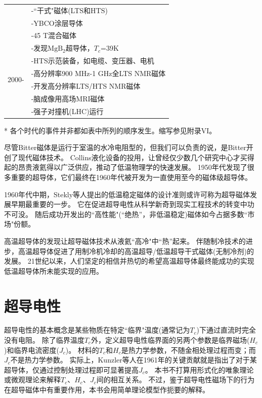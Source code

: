 \begin{table}[htbp]
\begin{threeparttable}
\begin{tabular}{ |c||l|}
 & -``干式"磁体(LTS和HTS)\\
 & -YBCO涂层导体\\
 & -45 T混合磁体\\
 \hline
  \multirow{6}{*}{2000-} & -发现$\mathrm{MgB_2}$超导体，$T_c$=39K \\
 & -HTS示范装备，如电缆、变压器、电机\\
 & -高分辨率900 MHz-1 GHz全LTS NMR磁体 \\
 & -开发高分辨率LTS/HTS NMR磁体\\
 & -脑成像用高场MRI磁体\\
 & -强子对撞机(LHC)运行\\
 \hline
\end{tabular}
 \begin{tablenotes}
        \footnotesize
        \item[*] 各个时代的事件并非都如表中所列的顺序发生。缩写参见附录VI。%
      \end{tablenotes}
    \end{threeparttable}
\end{table}

尽管Bitter磁体是运行于室温的水冷电阻型的，但我们可以负责的说，是Bitter开创了现代磁体技术。
Collins液化设备的投用，让曾经仅少数几个研究中心才买得起的昂贵液氦得以广泛供应，推动了低温物理学的快速发展。
1950年代发现了很多重要的超导体，它们最终在1960年代被开发为一直使用至今的磁体级超导体。

1960年代中期，Stekly等人提出的低温稳定磁体的设计准则或许可称为超导磁体发展早期最重要的一步。
它在促进超导电性从科学新奇到现实工程技术的转变中功不可没。
随后成功开发出的``高性能"(``绝热''，非低温稳定)磁体如今占据多数``市场"份额。

高温超导体的发现让超导磁体技术从液氦``高冷"中``热''起来。
伴随制冷技术的进步，高温超导体促进了用制冷机冷却的高温超导/低温超导干式磁体(无制冷剂)的发展。
21世纪以来，人们坚定的相信并热切的希望高温超导体最终能成功的实现低温超导体所未能实现的应用。

\section{超导电性}
超导电性的基本概念是某些物质在特定``临界"温度(通常记为$T_c$)下通过直流时完全没有电阻。
除了临界温度$T_c$外，定义超导电性临界面的另两个参数是临界磁场($H_c$)和临界电流密度($J_c$)。
材料的$T_c$和$H_c$是热力学参数，不随金相处理过程而变；而$J_c$不是热力学参数。
实际上，Kunzler等人在1961年的关键贡献就是指出了对于某超导体，仅通过控制处理过程即可显著提高$J_c$。
本书不打算用形式化的唯象理论或微观理论来解释$T_c$、$H_c$、$J_c$间的相互关系。
不过，鉴于超导电性磁场下的行为在超导磁体中有重要作用，本书会用简单理论模型作扼要的解释。

